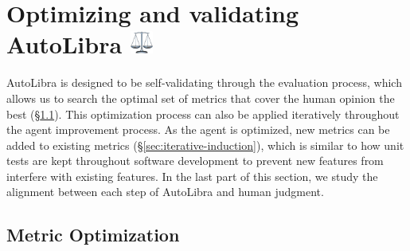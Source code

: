 \section{Optimizing and validating AutoLibra \protect
  \includegraphics[height=1em]{figs/scale.png}}
AutoLibra is designed to be self-validating through the evaluation process,
which allows us to search the optimal set of metrics that cover the human
opinion the best (\S\ref{sec:metric-optimization}). This optimization process
can also be applied iteratively throughout the agent improvement process. As the
agent is optimized, new metrics can be added to existing metrics (\S\ref{sec:iterative-induction}),
which is similar to how unit tests are kept throughout software development to
prevent new features from interfere with existing features. In the last part of this
section, we study the alignment between each step of AutoLibra and human
judgment.

\subsection{Metric Optimization}
\label{sec:metric-optimization}





